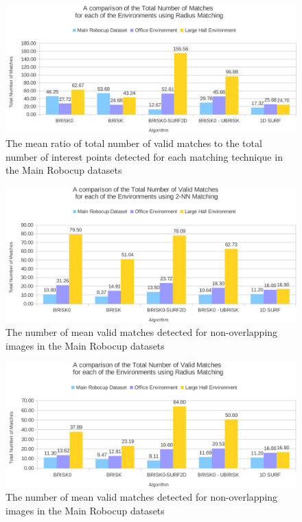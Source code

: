 \documentclass{report}
\begin{document}
\begin{figure}
  \centering
    \includegraphics[width=1.0\textwidth]{../Drawings/Graphs/overall_tnm_radius.pdf}
    \caption{The mean ratio of total number of valid matches to the total number of interest points detected for each matching technique in the Main Robocup datasets} 
    \label{fig:overall_tnm_radius}
\end{figure}

\begin{figure}
  \centering
    \includegraphics[width=1.0\textwidth]{../Drawings/Graphs/overall_nvm.pdf}
    \caption{The number of mean valid matches detected for non-overlapping images in the Main Robocup datasets} 
    \label{fig:overall_nvm}
\end{figure}

\begin{figure}
  \centering
    \includegraphics[width=1.0\textwidth]{../Drawings/Graphs/overall_nvm_radius.pdf}
    \caption{The number of mean valid matches detected for non-overlapping images in the Main Robocup datasets} 
    \label{fig:overall_nvm_radius}
\end{figure}
\end{document}
